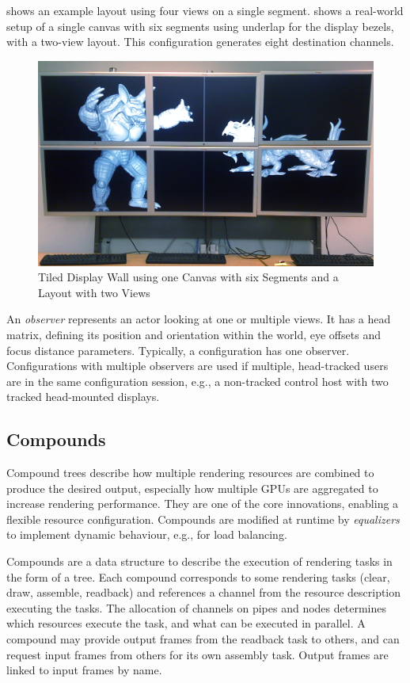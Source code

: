  shows an example layout using four views on a single segment.
 shows a real-world setup of a single canvas with six segments
using underlap for the display bezels, with a two-view layout. This
configuration generates eight destination channels.

\begin{figure}[t]\center
 \includegraphics[width=\textwidth]{images/wallLayout.jpg}
 {\caption{\label{fDisplay}Tiled Display Wall using one Canvas with six Segments and a Layout with two Views}}
\end{figure}

An {\em observer} represents an actor looking at one or multiple views. It
has a head matrix, defining its position and orientation within the world, eye
offsets and focus distance parameters. Typically, a configuration has one
observer. Configurations with multiple observers are used if multiple,
head-tracked users are in the same configuration session, e.g., a non-tracked
control host with two tracked head-mounted displays.

\subsection{Compounds}

Compound trees describe how multiple rendering resources are combined to
produce the desired output, especially how multiple GPUs are aggregated to
increase rendering performance. They are one of the core innovations, enabling
a flexible resource configuration. Compounds are modified at runtime by
{\em equalizers} to implement dynamic behaviour, e.g., for load balancing.

Compounds are a data structure to describe the execution of rendering tasks in
the form of a tree. Each compound corresponds to some rendering tasks (clear,
draw, assemble, readback) and references a channel from the resource
description executing the tasks. The allocation of channels on pipes and
nodes determines which resources execute the task, and what can be executed in
parallel. A compound may provide output frames from the readback task to
others, and can request input frames from others for its own assembly task.
Output frames are linked to input frames by name.


